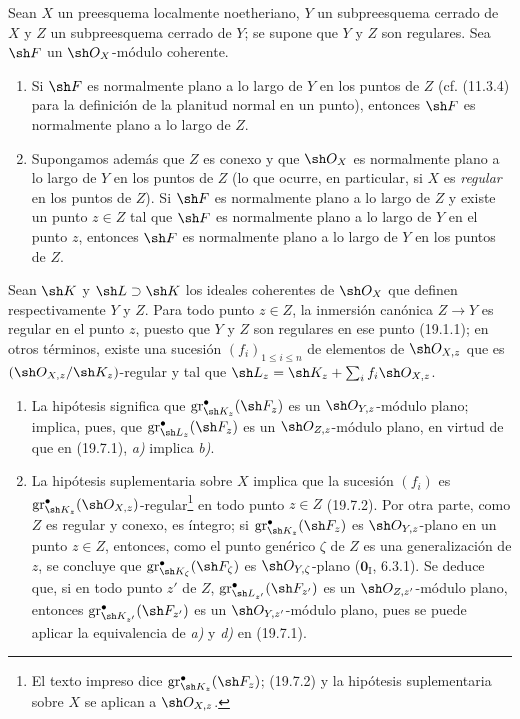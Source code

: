 \begin{corollary}[19.7.5]
\label{IV.19.7.5}
Sean $X$ un preesquema localmente noetheriano, $Y$ un subpreesquema cerrado de $X$ y $Z$ un subpreesquema cerrado de $Y$; se supone que $Y$ y $Z$ son regulares. Sea $\sh F$ un $\sh O_X$-módulo coherente.
\begin{enumerate}
  \item[\textup{(i)}] Si $\sh F$ es normalmente plano a lo largo de $Y$ en los puntos de $Z$ \textup{(cf. (11.3.4) para la definición de la planitud normal en un punto)}, entonces $\sh F$ es normalmente plano a lo largo de $Z$.
  \item[\textup{(ii)}] Supongamos además que $Z$ es conexo y que $\sh O_X$ es normalmente plano a lo largo de $Y$ en los puntos de $Z$ \textup{(lo que ocurre, en particular, si $X$ es \emph{regular} en los puntos de $Z$)}. Si $\sh F$ es normalmente plano a lo largo de $Z$ y existe \textup{un} punto $z\in Z$ tal que $\sh F$ es normalmente plano a lo largo de $Y$ en el punto $z$, entonces $\sh F$ es normalmente plano a lo largo de $Y$ en los puntos de $Z$.
\end{enumerate}
\end{corollary}

Sean $\sh K$ y $\sh L\supset\sh K$ los ideales coherentes de $\sh O_X$ que definen respectivamente $Y$ y $Z$. Para todo punto $z\in Z$, la inmersión canónica $Z\to Y$ es regular en el punto $z$, puesto que $Y$ y $Z$ son regulares en ese punto (19.1.1); en otros términos, existe una sucesión $(f_i)_{1\leq i\leq n}$ de elementos de $\sh O_{X,z}$ que es $(\sh O_{X,z}/\sh K_z)$-regular y tal que $\sh L_z=\sh K_z+\sum_i f_i\sh O_{X,z}$.
\begin{enumerate}
  \item[(i)] La hipótesis significa que $\operatorname{gr}_{\sh K_z}^\bullet(\sh F_z)$ es un $\sh O_{Y,z}$-módulo plano; implica, pues, que $\operatorname{gr}_{\sh L_z}^\bullet(\sh F_z)$ es un $\sh O_{Z,z}$-módulo plano, en virtud de que en (19.7.1), \emph{a)} implica \emph{b)}.
  \item[(ii)] La hipótesis suplementaria sobre $X$ implica que la sucesión $(f_i)$ es $\operatorname{gr}_{\sh K_z}^\bullet(\sh O_{X,z})$-regular\footnote{El texto impreso dice $\operatorname{gr}_{\sh K_z}^\bullet(\sh F_z)$; (19.7.2) y la hipótesis suplementaria sobre $X$ se aplican a $\sh O_{X,z}$.} en todo punto $z\in Z$ (19.7.2). Por otra parte, como $Z$ es regular y conexo, es íntegro; si $\operatorname{gr}_{\sh K_z}^\bullet(\sh F_z)$ es $\sh O_{Y,z}$-plano en un punto $z\in Z$, entonces, como el punto genérico $\zeta$ de $Z$ es una generalización de $z$, se concluye que $\operatorname{gr}_{\sh K_\zeta}^\bullet(\sh F_\zeta)$ es $\sh O_{Y,\zeta}$-plano ($\mathbf{0}_{\mathrm I}$, 6.3.1). Se deduce que, si en todo punto $z'$ de $Z$, $\operatorname{gr}_{\sh L_{z'}}^\bullet(\sh F_{z'})$ es un $\sh O_{Z,z'}$-módulo plano, entonces $\operatorname{gr}_{\sh K_{z'}}^\bullet(\sh F_{z'})$ es un $\sh O_{Y,z'}$-módulo plano, pues se puede aplicar la equivalencia de \emph{a)} y \emph{d)} en (19.7.1).
\end{enumerate}
